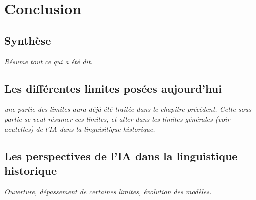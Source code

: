 \documentclass[12pt, french, twoside]{report}
\begin{document}
\chapter{Conclusion}
\section{Synthèse}
\textit{Résume tout ce qui a été dit.}
\section{Les différentes limites posées aujourd'hui}
\textit{une partie des limites aura déjà été traitée dans le chapitre précédent. Cette sous partie se veut résumer ces limites, et aller dans les limites générales (voir acutelles) de l'IA dans  la linguisitique historique.}
\section{Les perspectives de l'IA dans la linguistique historique}
\textit{Ouverture, dépassement de certaines limites, évolution des modèles.}


\end{document}
